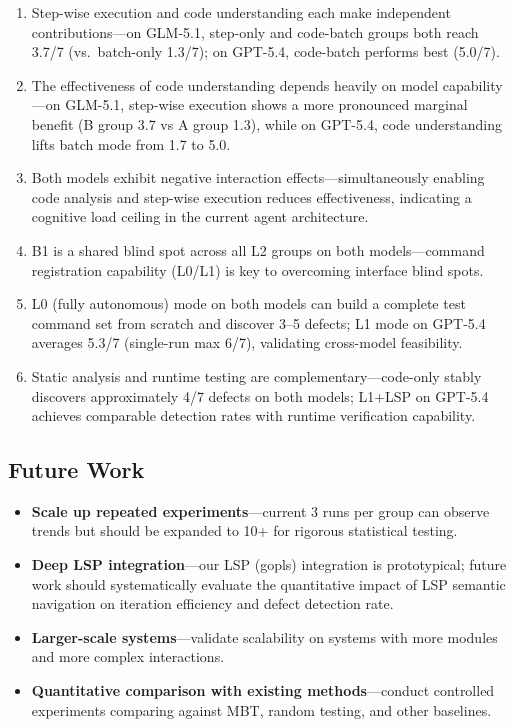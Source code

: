 \documentclass[sigconf,nonacm]{acmart}
\begin{document}
\begin{enumerate}
\item Step-wise execution and code understanding each make independent contributions---on GLM-5.1, step-only and code-batch groups both reach 3.7/7 (vs.\ batch-only 1.3/7); on GPT-5.4, code-batch performs best (5.0/7).
\item The effectiveness of code understanding depends heavily on model capability---on GLM-5.1, step-wise execution shows a more pronounced marginal benefit (B group 3.7 vs A group 1.3), while on GPT-5.4, code understanding lifts batch mode from 1.7 to 5.0.
\item Both models exhibit negative interaction effects---simultaneously enabling code analysis and step-wise execution reduces effectiveness, indicating a cognitive load ceiling in the current agent architecture.
\item B1 is a shared blind spot across all L2 groups on both models---command registration capability (L0/L1) is key to overcoming interface blind spots.
\item L0 (fully autonomous) mode on both models can build a complete test command set from scratch and discover 3--5 defects; L1 mode on GPT-5.4 averages 5.3/7 (single-run max 6/7), validating cross-model feasibility.
\item Static analysis and runtime testing are complementary---code-only stably discovers approximately 4/7 defects on both models; L1+LSP on GPT-5.4 achieves comparable detection rates with runtime verification capability.
\end{enumerate}

\subsection{Future Work}

\begin{itemize}
\item \textbf{Scale up repeated experiments}---current 3 runs per group can observe trends but should be expanded to 10+ for rigorous statistical testing.
\item \textbf{Deep LSP integration}---our LSP (gopls) integration is prototypical; future work should systematically evaluate the quantitative impact of LSP semantic navigation on iteration efficiency and defect detection rate.
\item \textbf{Larger-scale systems}---validate scalability on systems with more modules and more complex interactions.
\item \textbf{Quantitative comparison with existing methods}---conduct controlled experiments comparing against MBT, random testing, and other baselines.
\end{itemize}
\end{document}
